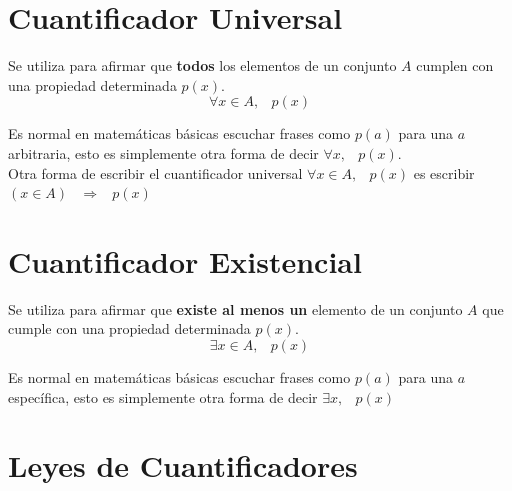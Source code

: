 \documentclass[12pt, fleqn]{report}                             %
\DeclareMathOperator \Space     {\quad}                         %
\DeclareMathOperator \MiniSpace {\;}                            %
\theoremstyle{break}                                            %
\newcommand \lInfire {\MiniSpace \Rightarrow \MiniSpace}        %
\begin{document}
        \clearpage
        \section{Cuantificador Universal}

            Se utiliza para afirmar que \textbf{todos} los elementos de un conjunto $A$ cumplen con una 
            propiedad determinada $p(x)$.
            \begin{equation*}
                \forall x \in A,\MiniSpace p(x)
            \end{equation*}

            Es normal en matemáticas básicas escuchar frases como $p(a)$ para una $a$ arbitraria, esto es
            simplemente otra forma de decir $\forall x ,\MiniSpace p(x)$.\\

            Otra forma de escribir el cuantificador universal $\forall x \in A,\MiniSpace p(x)$ es
            escribir $(x \in A) \lInfire p(x)$



        \section{Cuantificador Existencial}

            Se utiliza para afirmar que \textbf{existe al menos un} elemento de un conjunto $A$ que 
            cumple con una propiedad determinada $p(x)$.
            \begin{equation*}
                \exists x \in A,\MiniSpace p(x)
            \end{equation*}

            Es normal en matemáticas básicas escuchar frases como $p(a)$ para una $a$ específica, esto es
            simplemente otra forma de decir $\exists x, \MiniSpace p(x)$



        \clearpage
        \section{Leyes de Cuantificadores}
                    
\end{document}
